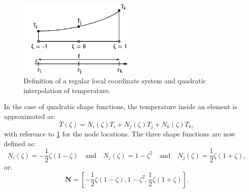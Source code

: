 \documentclass[10pt, a4paper, twoside, headinclude,footinclude, BCOR5mm]{scrartcl}
\begin{document}
\begin{figure}[htbp]
\centering
\includegraphics[width=6cm]{./fig/qua_elements_sf.png}
\caption{\label{fig:org68d459c}Definition of a regular local coordinate system and quadratic interpolation of temperature.}
\end{figure}

In the case of quadratic shape functions, the temperature inside an element is approximated as:
\begin{equation}
  T(\zeta) = N_i(\zeta)T_i + N_j(\zeta)T_j + N_k(\zeta)T_k,
  \label{eq:qua_interp}
\end{equation}
with reference to \ref{fig:org68d459c} for the node locations. The three shape functions are now defined as:
\begin{equation}
  N_i(\zeta) = -\frac{1}{2}\zeta (1-\zeta) \quad\text{and}\quad
  N_j(\zeta) = 1-\zeta^2 \quad\text{and}\quad
  N_j(\zeta) = \frac{1}{2}\zeta (1+\zeta),
  \label{eq:qua_shape_functions}
\end{equation}
or:
\begin{equation*}
  \mathbf{N} = \left[ -\frac{1}{2}\zeta (1-\zeta),
  1-\zeta^2,
  \frac{1}{2}\zeta (1+\zeta)\right].
\end{equation*}
\end{document}
